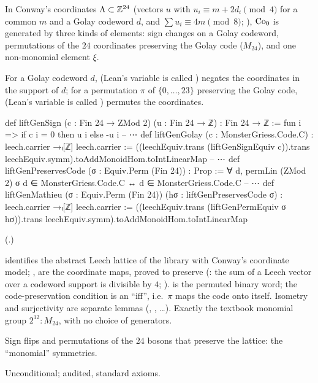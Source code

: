 In Conway's coordinates ${\Lambda}\subset{\mathbb{Z}}^{24}$ (vectors $u$ with $u_i\equiv m+2d_i\pmod 4$ for a common $m$ and a Golay
codeword $d$, and $\sum u_i\equiv4m\pmod 8$; ), $\mathrm{Co}_0$ is generated by three kinds of
elements: sign changes on a Golay codeword, permutations of the $24$ coordinates preserving the Golay code ($M_{24}$),
and one non-monomial element $\xi$.

\begin{definition}\label{ch22:def:monomial}
For a Golay codeword $d$,  (Lean's variable is called ) negates the coordinates in the
support of $d$; for a permutation $\pi$ of $\{0,\dots,23\}$ preserving the Golay code, 
(Lean's variable is called ) permutes the coordinates.
\end{definition}
\begin{leancode}
def liftGenSign (c : Fin 24 → ZMod 2) (u : Fin 24 → ℤ) : Fin 24 → ℤ :=
  fun i => if c i = 0 then u i else -u i
-- ⋯
def liftGenGolay (c : MonsterGriess.Code.C) : leech.carrier →ₗ[ℤ] leech.carrier :=
  ((leechEquiv.trans (liftGenSignEquiv c)).trans leechEquiv.symm).toAddMonoidHom.toIntLinearMap
-- ⋯
def liftGenPreservesCode (σ : Equiv.Perm (Fin 24)) : Prop :=
  ∀ d, permLin (ZMod 2) σ d ∈ MonsterGriess.Code.C ↔ d ∈ MonsterGriess.Code.C
-- ⋯
def liftGenMathieu (σ : Equiv.Perm (Fin 24)) (hσ : liftGenPreservesCode σ) :
    leech.carrier →ₗ[ℤ] leech.carrier :=
  ((leechEquiv.trans (liftGenPermEquiv σ hσ)).trans
    leechEquiv.symm).toAddMonoidHom.toIntLinearMap
\end{leancode}
(.)
\begin{dictionary}
 identifies the abstract Leech lattice of the library with Conway's coordinate model;
,  are the coordinate maps, proved to preserve
 (: the sum of a Leech vector over a codeword support is divisible by $4$;
).   is the permuted binary word; the code-preservation condition is
an ``iff'', i.e.\ $\pi$ maps the code onto itself.  Isometry and surjectivity are separate lemmas
(, , \dots).  Exactly the textbook monomial group
$2^{12}{:}M_{24}$, with no choice of generators.
\end{dictionary}
\begin{physics}
Sign flips and permutations of the $24$ bosons that preserve the lattice: the ``monomial'' symmetries.
\end{physics}
\begin{status}Unconditional; audited, standard axioms.\end{status}

